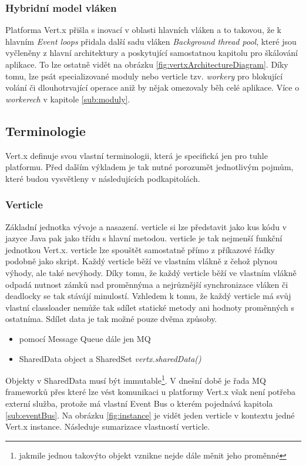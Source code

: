 \subsubsection{Hybridní model vláken}\label{sub:hybrid}

Platforma Vert.x přišla s inovací v oblasti hlavních vláken a to takovou, že k hlavním \emph{Event loops} přidala další sadu vláken \emph{Background thread pool}, které jsou vyčleněny z hlavní architektury a poskytující samostatnou kapitolu pro škálování aplikace. To lze ostatně vidět na obrázku \vref{fig:vertxArchitectureDiagram}. Díky tomu, lze psát specializované moduly nebo verticle tzv. \emph{workery} pro blokující volání či dlouhotrvající operace aniž by nějak omezovaly běh celé aplikace. Více o \emph{workerech} v kapitole \ref{sub:moduly}.

\subsection{Terminologie}

Vert.x definuje svou vlastní terminologii, která je specifická jen pro tuhle platformu. Před dalším výkladem je tak nutné porozumět jednotlivým pojmům, které budou vysvětleny v následujících podkapitolách.

\subsubsection{Verticle}

Základní jednotka vývoje a nasazení. verticle si lze představit jako kus kódu v jazyce Java pak jako třídu s hlavní metodou. verticle je tak nejmenší funkční jednotkou Vert.x. verticle lze spouštět samostatně přímo z příkazové řádky podobně jako skript. Každý verticle běží ve vlastním vlákně z čehož plynou výhody, ale také nevýhody. Díky tomu, že každý verticle běží ve vlastním vlákně odpadá nutnost zámků nad proměnnýma a nejrůznější synchronizace vláken či deadlocky se tak stávájí minulostí. Vzhledem k tomu, že každý verticle má svůj vlastní classloader nemůže tak sdílet statické metody ani hodnoty proměnných s ostatníma. Sdílet data je tak možné pouze dvěma způsoby.
\begin{itemize}
\item{pomocí Message Queue\cite{mq} dále jen MQ}
\item{SharedData object a SharedSet \emph{vertx.sharedData()}}
\end{itemize}
Objekty v SharedData musí být immutable\footnote{jakmile jednou takovýto objekt vznikne nejde dále měnit jeho proměnné}. V dnešní době je řada MQ frameworků přes které lze vést komunikaci u platformy Vert.x však není potřeba externí služba, protože má vlastní Event Bus o kterém pojednává kapitola \ref{sub:eventBus}. Na obrázku \ref{fig:instance} je vidět jeden verticle v kontextu jedné Vert.x instance. Následuje sumarizace vlastností verticle.

